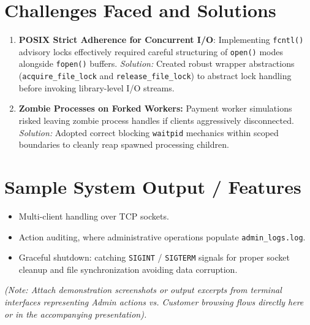 \documentclass[12pt,a4paper]{article}
\begin{document}
\section{Challenges Faced and Solutions}
\begin{enumerate}
    \item \textbf{POSIX Strict Adherence for Concurrent I/O}: Implementing \texttt{fcntl()} advisory locks effectively required careful structuring of \texttt{open()} modes alongside \texttt{fopen()} buffers. \textit{Solution:} Created robust wrapper abstractions (\texttt{acquire\_file\_lock} and \texttt{release\_file\_lock}) to abstract lock handling before invoking library-level I/O streams.
    \item \textbf{Zombie Processes on Forked Workers:} Payment worker simulations risked leaving zombie process handles if clients aggressively disconnected. \textit{Solution:} Adopted correct blocking \texttt{waitpid} mechanics within scoped boundaries to cleanly reap spawned processing children.
\end{enumerate}

\section{Sample System Output / Features}

\begin{itemize}
    \item Multi-client handling over TCP sockets.
    \item Action auditing, where administrative operations populate \texttt{admin\_logs.log}.
    \item Graceful shutdown: catching \texttt{SIGINT} / \texttt{SIGTERM} signals for proper socket cleanup and file synchronization avoiding data corruption.
\end{itemize}

\vspace{2em}
\textit{(Note: Attach demonstration screenshots or output excerpts from terminal interfaces representing Admin actions vs. Customer browsing flows directly here or in the accompanying presentation).}
\end{document}

